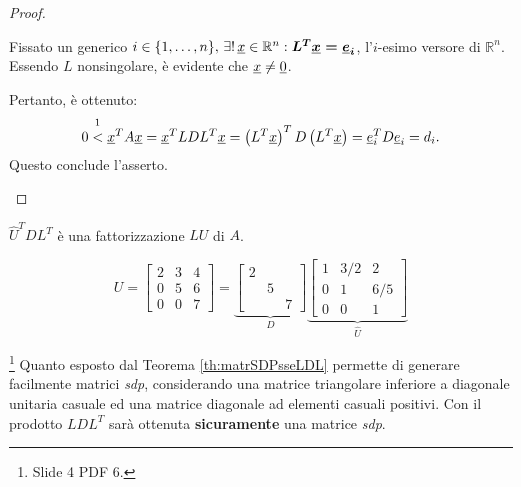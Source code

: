 \begin{proof}
\begin{itemize}
        Fissato un generico $i\in\{1,\hdots, n\},\, \exists!\, \uline x\in\mathbb R^n:\boldsymbol{L^T\uline x=\uline e_i}$, l'$i$-esimo versore di $\mathbb R^n.$  Essendo $L$ nonsingolare, è evidente che $\uline x \neq \uline 0$.
        
        Pertanto, è ottenuto:
        \begin{equation*}
            0\overset{\footnotemark}{<}\uline x^T A\uline x = \uline x^T LDL^T \uline x = \left(L^T \uline x\right)^T D \left(L^T \uline x\right) = \uline e_i^T D \uline e_i = d_i.
        \end{equation*}
        Questo conclude l'asserto.
    \end{itemize}
\end{proof}

\addtocounter{footnote}{-1}


\begin{remark}
    $\widehat U^TD L^T$ è una fattorizzazione $LU$ di $A$.
\end{remark}

\begin{example}
    \begin{equation*}
        U =
        \begin{bmatrix}
            2 & 3 & 4\\
            0 & 5 & 6\\
            0 & 0 & 7
        \end{bmatrix} = 
        \underbrace{
        \begin{bmatrix}
            2 & & \\
            & 5 &\\
            & & 7
        \end{bmatrix}}_{D}
        \underbrace{
        \begin{bmatrix}
            1 & 3/2 & 2\\
            0 & 1 & 6/5\\
            0 & 0 & 1
        \end{bmatrix}}_{\widehat U}
    \end{equation*}
\end{example}

\begin{remark}\footnote{Slide 4 PDF 6.}
    Quanto esposto dal Teorema \ref{th:matrSDPsseLDL} permette di generare facilmente matrici \textit{sdp}, considerando una matrice triangolare inferiore a diagonale unitaria casuale ed una matrice diagonale ad elementi casuali positivi.
    Con il prodotto $LDL^T$ sarà ottenuta \textbf{sicuramente} una matrice \textit{sdp}.
\end{remark}

